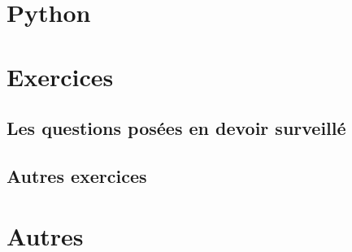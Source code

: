 \documentclass[a4paper,12pt]{book}
\begin{document}
\part{Python}



\part{Exercices}

\chapter{Les questions posées en devoir surveillé}


\chapter{Autres exercices}


%

\part{Autres}







\printindex
\end{document}
